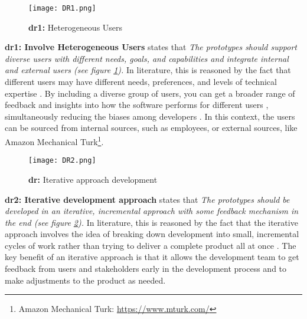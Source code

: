 \begin{figure}[htbp!]
  \centering    
  \texttt{[image: DR1.png]}
  \caption[Heterogeneous Users]{\textbf{\ac{dr}1:} Heterogeneous Users}
  \label{fig:design:dr1}
\end{figure}
\textbf{\ac{dr}1: Involve Heterogeneous Users} states that \textit{The prototypes should support diverse users with different needs, goals, and capabilities and integrate internal and external users (see figure \ref{fig:design:dr1}).} 
In literature, this is reasoned by the fact that different users may have different needs, preferences, and levels of technical expertise \cite{misc:lean:steve}.
By including a diverse group of users, you can get a broader range of feedback and insights into how the software performs for different users \cite{article:prototyping:weichbroth}, simultaneously reducing the biases among developers \cite{misc:lean:burmeister}.
In this context, the users can be sourced from internal sources, such as employees, or external sources, like Amazon Mechanical Turk\footnote{Amazon Mechanical Turk: \url{https://www.mturk.com/}}.

\begin{figure}[htbp!]
  \centering    
  \texttt{[image: DR2.png]}
  \caption[Iterative approach development]{\textbf{\ac{dr}:} Iterative approach development}
  \label{fig:design:dr2}
\end{figure}
\textbf{\ac{dr}2: Iterative development approach} states that \textit{The prototypes should be developed in an iterative, incremental approach with some feedback mechanism in the end (see figure \ref{fig:design:dr2}).} 
In literature, this is reasoned by the fact that the iterative approach involves the idea of breaking down development into small, incremental cycles of work rather than trying to deliver a complete product all at once \cite{misc:lean:tutorial}.
The key benefit of an iterative approach is that it allows the development team to get feedback from users and stakeholders early in the development process and to make adjustments \cite{article:experiments:lindgren} to the product as needed.

